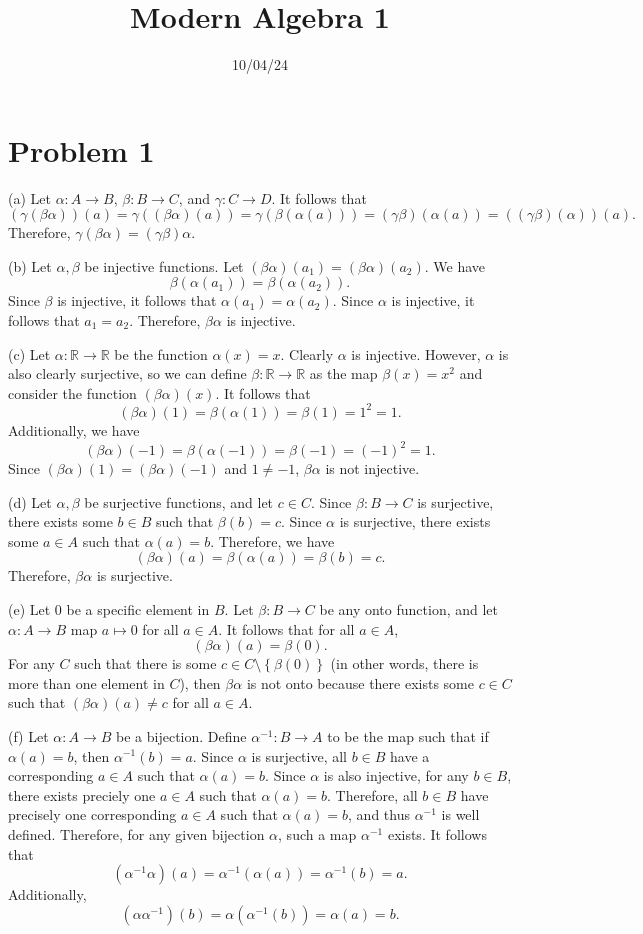 \documentclass[11pt, letterpaper]{report}
\title{Modern Algebra 1}
\date{10/04/24}
\begin{document}
\makeproblem
\section*{Problem 1}
(a) Let $\alpha : A \to B$, $\beta : B \to C$, and $\gamma : C \to D$. It follows that
\[
	(\gamma (\beta \alpha ))(a)=\gamma ((\beta \alpha )(a))=\gamma (\beta (\alpha (a)))=(\gamma \beta )(\alpha (a))=((\gamma \beta )(\alpha ))(a)
.\]
Therefore, $\gamma (\beta \alpha )=(\gamma \beta )\alpha $.

(b) Let $\alpha ,\beta $ be injective functions. Let $(\beta \alpha )(a_1)=(\beta \alpha )(a_2)$. We have
\[
	\beta (\alpha (a_1))=\beta (\alpha (a_2))
.\]
Since $\beta $ is injective, it follows that $\alpha (a_1)=\alpha (a_2)$. Since $\alpha $ is injective, it follows that $a_1=a_2$. Therefore, $\beta \alpha $ is injective.

(c) Let $\alpha : \mathbb{R} \to \mathbb{R}$ be the function $\alpha (x)=x$. Clearly $\alpha $ is injective. However, $\alpha $ is also clearly surjective, so we can define $\beta : \mathbb{R} \to \mathbb{R}$ as the map $\beta (x)=x^2$ and consider the function $(\beta \alpha )(x)$. It follows that
\[
	(\beta \alpha )(1)=\beta (\alpha (1))=\beta (1)=1^2=1
.\]
Additionally, we have
\[
	(\beta \alpha )(-1)=\beta (\alpha (-1))=\beta (-1)=(-1)^2=1
.\]
Since $(\beta \alpha )(1)=(\beta \alpha )(-1)$ and $1\neq -1$, $\beta \alpha $ is not injective.

(d) Let $\alpha ,\beta $ be surjective functions, and let $c\in C$. Since $\beta : B \to C$ is surjective, there exists some $b\in B$ such that $\beta (b)=c$. Since $\alpha $ is surjective, there exists some $a\in A$ such that $\alpha (a)=b$. Therefore, we have
\[
	(\beta \alpha )(a)=\beta (\alpha (a))=\beta (b)=c
.\]
Therefore, $\beta \alpha $ is surjective.

(e) Let $0$ be a specific element in $B$. Let $\beta : B \to C$ be any onto function, and let $\alpha : A \to B$ map $a\mapsto 0$ for all $a\in A$. It follows that for all $a\in A$,
\[
	\left( \beta \alpha  \right) (a)=\beta (0)
.\]
For any $C$ such that there is some $c\in C\setminus\left\{ \beta (0) \right\} $ (in other words, there is more than one element in $C$), then $\beta \alpha $ is not onto because there exists some $c\in C$ such that $(\beta \alpha )(a)\neq c$ for all $a\in A$.


(f) Let $\alpha : A \to B$ be a bijection. Define $\alpha ^{-1}: B \to A$ to be the map such that if $\alpha (a)=b$, then $\alpha ^{-1}(b)=a$. Since $\alpha $ is surjective, all $b\in B$ have a corresponding $a \in A$ such that $\alpha (a)=b$. Since $\alpha $ is also injective, for any $b\in B$, there exists preciely one $a\in A$ such that $\alpha (a)=b$. Therefore, all $b\in B$ have precisely one corresponding $a\in A$ such that $\alpha (a)=b$, and thus $\alpha ^{-1}$ is well defined. Therefore, for any given bijection $\alpha $, such a map $\alpha ^{-1}$ exists. It follows that
\[
	\left( \alpha^{-1} \alpha \right) (a)=\alpha ^{-1}(\alpha (a))=\alpha ^{-1}(b)=a
.\]
Additionally,
\[
	\left( \alpha \alpha ^{-1} \right) (b)=\alpha \left( \alpha ^{-1}(b) \right) =\alpha (a)=b
.\]
\end{document}
